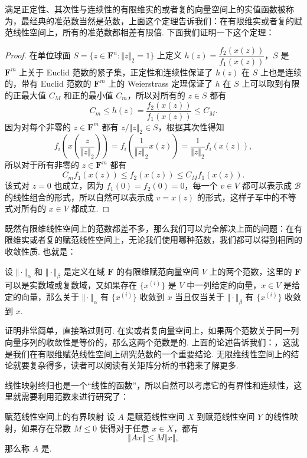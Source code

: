 满足正定性、其次性与连续性的有限维实的或者复的向量空间上的实值函数被称为，最经典的准范数当然是范数，上面这个定理告诉我们：在有限维实或者复的赋范线性空间上，所有的准范数都相差有限倍. 下面我们证明一下这个定理：

\begin{proof}
    在单位球面 $S = \{z\in \mathbf{F}^n \colon \Vert z\Vert_2 = 1\}$ 上定义 $h(z) = \dfrac{f_2(x(z))}{f_1(x(z))}$，$S$ 是 $\mathbf{F}^m$ 上关于 Euclid 范数的紧子集，正定性和连续性保证了 $h(z)$ 在 $S$ 上也是连续的，带有 Euclid 范数的 $\mathbf{F}^m$ 上的 Weierstrass 定理保证了 $h$ 在 $S$ 上可以取到有限的正最大值 $C_M$ 和正的最小值 $C_m$，所以对所有的 $z\in S$ 都有 \[C_m\leqslant h(z) = \frac{f_2(x(z))}{f_1(x(z))}\leqslant C_M.\]
    因为对每个非零的 $z\in\mathbf{F}^m$ 都有 $z/\Vert z\Vert_2\in S$，根据其次性得知 \[f_i(x(\frac{z}{\Vert z\Vert_2})) = f_i(\frac{1}{\Vert z\Vert_2}x(z)) = \frac{1}{\Vert z\Vert_2}f_i(x(z)),\]
    所以对于所有非零的 $z\in\mathbf{F}^m$ 都有 \[C_m f_1(x(z))\leqslant f_2(x(z))\leqslant C_M f_1(x(z)).\]
    该式对 $z = 0$ 也成立，因为 $f_1(0) = f_2(0) = 0$，每一个 $v\in V$ 都可以表示成 $\mathcal{B}$ 的线性组合的形式，所以自然可以表示成 $v = x(z)$ 的形式，这样孑军中的不等式对所有的 $x\in V$ 都成立.
\end{proof}

既然有限维线性空间上的范数都差不多，那么我们可以完全解决上面的问题：在有限维实或者复的赋范线性空间上，无论我们使用哪种范数，我们都可以得到相同的收敛性质. 也就是：

\begin{corollary}{}{}
    设 $\Vert \cdot\Vert_\alpha$ 和 $\Vert \cdot\Vert_\beta$ 是定义在域 $\mathbf{F}$ 的有限维赋范向量空间 $V$ 上的两个范数，这里的 $\mathbf{F}$ 可以是实数域或复数域，又如果存在 $\{x^{(i)}\}$ 是 $V$ 中一列给定的向量，$x\in V$ 是给定的向量，那么关于 $\Vert \cdot\Vert_\alpha$ 有 $\{x^{(i)}\}$ 收敛到 $x$ 当且仅当关于 $\Vert \cdot\Vert_\beta$ 有 $\{x^{(i)}\}$ 收敛到 $x$.
\end{corollary}

证明非常简单，直接略过则可. 在实或者复向量空间上，如果两个范数关于同一列向量序列的收敛性是等价的，那么这两个范数是的. 上面的论述告诉我们：，这就是我们在有限维赋范线性空间上研究范数的一个重要结论. 无限维线性空间上的结论就要复杂得多，读者可以阅读有关矩阵分析的书籍来了解更多.

线性映射终归也是一个“线性的函数”，所以自然可以考虑它的有界性和连续性，这里就需要利用范数来进行研究了：

\begin{definition}{赋范线性空间上的有界映射}{}
    设 $A$ 是赋范线性空间 $X$ 到赋范线性空间 $Y$ 的线性映射，如果存在常数 $M\leqslant 0$ 使得对于任意 $x\in X$，都有 \[\Vert Ax\Vert\leqslant M\Vert x\Vert,\]
    那么称 $A$ 是.
\end{definition}

